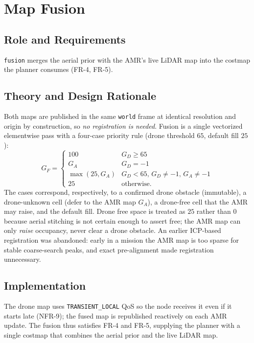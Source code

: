 \documentclass[conference]{IEEEtran}
\newcommand{\subsys}[1]{\texttt{#1}}      %
\begin{document}
\section{Map Fusion}
\label{sec:fusion}

\subsection{Role and Requirements}
\subsys{fusion} merges the aerial prior with the AMR's live LiDAR map into the
costmap the planner consumes (FR-4, FR-5).

\subsection{Theory and Design Rationale}
Both maps are published in the same \texttt{world} frame at identical resolution
and origin by construction, so \emph{no registration is needed}. Fusion is a
single vectorized elementwise pass with a four-case priority rule (drone
threshold $65$, default fill $25$):
\begin{equation}
G_F=\begin{cases}
100 & G_D\geq 65\\
G_A & G_D=-1\\
\max(25,G_A) & G_D<65,\,G_D\neq-1,\,G_A\neq-1\\
25 & \text{otherwise.}
\end{cases}
\end{equation}
The cases correspond, respectively, to a confirmed drone obstacle (immutable), a
drone-unknown cell (defer to the AMR map $G_A$), a drone-free cell that the AMR
may raise, and the default fill. Drone free space is treated as $25$ rather than
$0$ because aerial stitching is not certain enough to assert free; the AMR map can
only \emph{raise} occupancy, never clear a drone obstacle. An earlier ICP-based registration was abandoned:
early in a mission the AMR map is too sparse for stable coarse-search peaks, and
exact pre-alignment made registration unnecessary.

\subsection{Implementation}
The drone map uses \texttt{TRANSIENT\_LOCAL} QoS so the node receives it even if
it starts late (NFR-9); the fused map is republished reactively on each AMR
update. The fusion thus satisfies FR-4 and FR-5, supplying the planner with a
single costmap that combines the aerial prior and the live LiDAR map.
\end{document}
